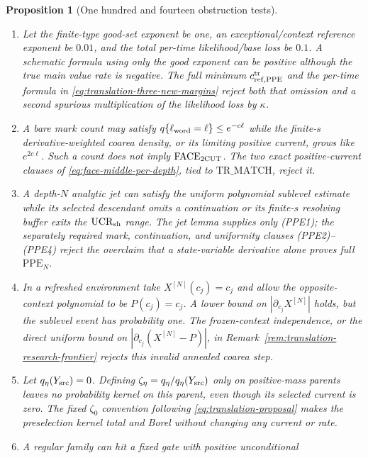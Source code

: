 \documentclass[11pt]{article}
\newtheorem{proposition}[theorem]{Proposition}
\begin{document}
\begin{proposition}[One hundred and fourteen obstruction tests]
\begin{enumerate}[label=\textup{(T\arabic*)}]
      $q$-pushforward domination \eqref{eq:propagated-q-physical-match},
      now part of $\mathrm{TR\_MATCH}$, rejects the model.
\item Let the finite-type good-set exponent be one, an exceptional/context
      reference exponent be $0.01$, and the total per-time likelihood/base
      loss be $0.1$.  A schematic formula using only the good exponent can
      be positive although the true main value rate is negative.  The full
      minimum $c_{{\rm ref},{\rm PPE}}^{\rm tr}$ and the per-time formula in
      \eqref{eq:translation-three-new-margins} reject both that omission and
      a second spurious multiplication of the likelihood loss by $\kappa$.
\item A bare mark count may satisfy
      $q\{\ell_{\rm word}=\ell\}\le e^{-c\ell}$ while the finite-$s$
      derivative-weighted coarea density, or its limiting positive current,
      grows like $e^{2c\ell}$.  Such a count does not imply
      $\mathrm{FACE}_{\rm 2CUT}$.  The two exact positive-current clauses of
      \eqref{eq:face-middle-per-depth}, tied to $\mathrm{TR\_MATCH}$, reject
      it.
\item A depth-$N$ analytic jet can satisfy the uniform polynomial sublevel
      estimate while its selected descendant omits a continuation or its
      finite-$s$ resolving buffer exits the $\mathrm{UCR}_{\rm sh}$ range.
      The jet lemma supplies only \textup{(PPE1)}; the separately required
      mark, continuation, and uniformity clauses \textup{(PPE2)--(PPE4)}
      reject the overclaim that a
      state-variable derivative alone proves full $\mathrm{PPE}_N$.
\item In a refreshed environment take $X^{[N]}(c_j)=c_j$ and allow the
      opposite-context polynomial to be $P(c_j)=c_j$.  A lower bound on
      $|\partial_{c_j}X^{[N]}|$ holds, but the sublevel event has probability
      one.  The frozen-context independence, or the direct uniform bound on
      $|\partial_{c_j}(X^{[N]}-P)|$, in
      Remark~\ref{rem:translation-research-frontier} rejects this invalid
      annealed coarea step.
\item Let $q_\eta(Y_{\rm src})=0$.  Defining
      $\zeta_\eta=q_\eta/q_\eta(Y_{\rm src})$ only on positive-mass parents
      leaves no probability kernel on this parent, even though its selected
      current is zero.  The fixed $\zeta_0$ convention following
      \eqref{eq:translation-proposal} makes the preselection kernel total and
      Borel without changing any current or rate.
\item A regular family can hit a fixed gate with positive unconditional

\end{enumerate}
\end{proposition}
\end{document}
